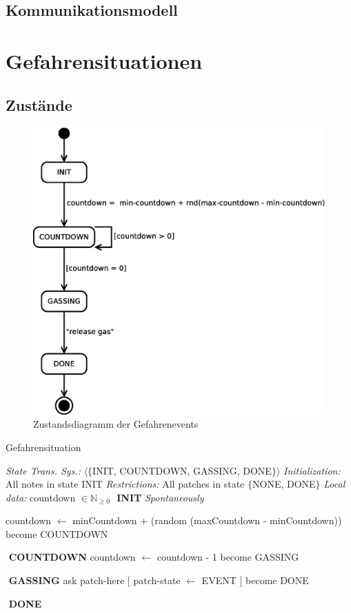 \subsection{Kommunikationsmodell}
\label{sec:notausgaenge_kommunikation}



\section{Gefahrensituationen}
\label{sec:gefahrensituationen}

\subsection{Zustände}


\begin{figure}
\centering
\includegraphics[height=0.6\textwidth]{simulationsumgebung/event.eps}
\caption{Zustandsdiagramm der Gefahrenevents}
\label{fig:event}
\end{figure}

\begin{algorithm}
\caption{Gefahrensituation}
\begin{algorithmic} 
\STATE \textit{State Trans. Sys.:} $\langle\{$INIT, COUNTDOWN, GASSING, DONE$\}\rangle$
\STATE \textit{Initialization:} All notes in state INIT
\STATE \textit{Restrictions:} All patches in state $\{$NONE, DONE$\}$
\STATE \textit{Local data:} countdown $\in \mathbb{N}_{\geq0}$ 
\STATE $ $
\STATE \textbf{INIT}
\STATE \textit{Spontaneously}

\STATE countdown $\leftarrow$ minCountdown + (random (maxCountdown - minCountdown))
\STATE become COUNTDOWN


\STATE $ $
\STATE \textbf{COUNTDOWN}
\STATE countdown $\leftarrow$ countdown - 1
\STATE become GASSING
\ENDIF

\STATE $ $
\STATE \textbf{GASSING}
\STATE ask patch-here $[$ patch-state $\leftarrow$ EVENT $]$ 
\STATE become DONE

\STATE $ $
\STATE \textbf{DONE}

\end{algorithmic}
\end{algorithm}


